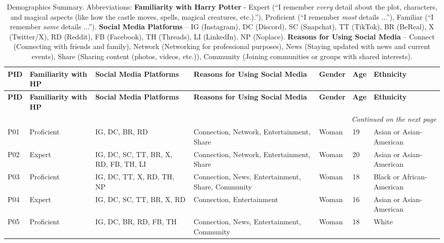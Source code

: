 \begingroup
\begin{spacing}{1.1}
\begin{longtable}{lp{1.7cm}p{2cm}p{3.5cm}p{1.5cm}p{0.5cm}p{1.7cm}}
    \caption{Demographics Summary. Abbreviations: \textbf{Familiarity with Harry Potter} - Expert (``I remember \textit{every} detail about the plot, characters, and magical aspects (like how the castle moves, spells, magical creatures, etc.).''), Proficient (``I remember \textit{most} details ...''), Familiar (``I remember \textit{some} details ...''). \textbf{Social Media Platforms} – IG (Instagram), DC (Discord), SC (Snapchat), TT (TikTok), BR (BeReal), X (Twitter/X), RD (Reddit), FB (Facebook), TH (Threads), LI (LinkedIn), NP (Noplace). \textbf{Reasons for Using Social Media} – Connect (Connecting with friends and family), Network (Networking for professional purposes), News (Staying updated with news and current events), Share (Sharing content (photos, videos, etc.)), Community (Joining communities or groups with shared interests).} \\
    \toprule
    \textbf{PID} & \textbf{Familiarity with HP} & \textbf{Social Media Platforms} & \textbf{Reasons for Using Social Media} & \textbf{Gender} & \textbf{Age} & \textbf{Ethnicity} \\
    \midrule
    \endfirsthead
    \toprule
    \textbf{PID} & \textbf{Familiarity with HP} & \textbf{Social Media Platforms} & \textbf{Reasons for Using Social Media} & \textbf{Gender} & \textbf{Age} & \textbf{Ethnicity} \\
    \midrule
    \endhead
    \midrule
    \multicolumn{7}{r}{\textit{Continued on the next page}} \\
    \midrule
    \endfoot
    \bottomrule
    \endlastfoot    
       P01 & Proficient & IG, DC, BR, RD & Connection, Network, Entertainment, Share & Woman & 19 & Asian or Asian-American \\ 
        P02 & Expert & IG, DC, SC, TT, BR, X, RD, FB, TH, LI  & Connection, Network, Entertainment, Share & Woman & 20 & Asian or Asian-American \\ 
        P03 & Proficient & IG, DC, TT, X, RD, TH, NP & Connection, News, Entertainment, Share, Community & Woman & 18 & Black or African-American \\ 
        P04 & Expert & IG, DC, SC, TT, BR, X, RD & Connection, Entertainment & Woman & 16 & Asian or Asian-American \\ 
        P05 & Proficient & IG, DC, BR, RD, FB, TH & Connection, News, Entertainment, Community & Woman & 18 & White \\

\end{longtable}
\end{spacing}
